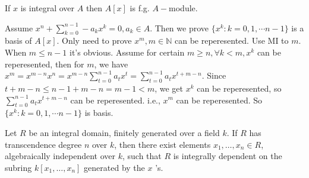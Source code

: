 \documentclass{ctexart}
\newcommand\<{\langle}
\renewcommand\>{\rangle}
\newcommand\N{\mathbb{N}}
\begin{document}
\begin{problem}
  If $x$ is integral over $A$ then $A[x]$ is f.g. $A-$module.
\end{problem}
\begin{solution}
  Assume $x^n+\sum_{k=0}^{n-1}-a_kx^k=0,a_k\in A$. Then we prove $\{x^k:k=0,1,\cdots n-1\}$ is a basis of $A[x]$. Only need to prove $x^m,m\in \N$ can be reperesented. Use MI to $m$. When $m\leq n-1$ it's obvious. Assume for certain $m\geq n,\forall k<m,x^k$ can be reperesented, then for $m$, we have $x^m=x^{m-n}x^n=x^{m-n}\sum_{t=0}^{n-1}a_tx^t=\sum_{t=0}^{n-1}a_tx^{t+m-n}$. Since $t+m-n\leq n-1+m-n=m-1<m$, we get $x^k$ can be reperesented, so $\sum_{t=0}^{n-1}a_tx^{t+m-n}$ can be reperesented. i.e., $x^m$ can be reperesented. So $\{x^k:k=0,1,\cdots n-1\}$ is basis.
\end{solution}

\begin{problem}
  Let $R$ be an integral domain, finitely generated over a field $k$. If $R$ has transcendence degree $n$ over $k$, then there exist elements $x_1, \ldots, x_n \in R$, algebraically independent over $k$, such that $R$ is integrally dependent on the subring $k\left[x_1, \ldots, x_n\right]$ generated by the $x$ 's.
\end{problem}
\end{document}
